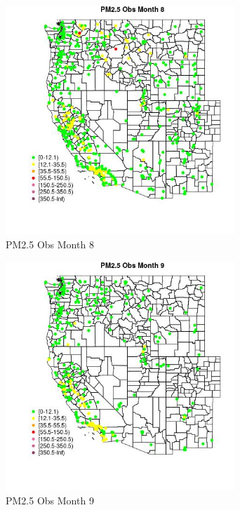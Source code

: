 \begin{figure} 
\centering  
\includegraphics[width=0.77\textwidth]{Code_Outputs/Report_ML_input_PM25_Step4_part_e_de_duplicated_aves_compiled_2019-05-18wNAs_MapObsMo8PM25_Obs.jpg} 
\caption{\label{fig:Report_ML_input_PM25_Step4_part_e_de_duplicated_aves_compiled_2019-05-18wNAsMapObsMo8PM25_Obs}PM2.5 Obs Month 8} 
\end{figure} 
 

\begin{figure} 
\centering  
\includegraphics[width=0.77\textwidth]{Code_Outputs/Report_ML_input_PM25_Step4_part_e_de_duplicated_aves_compiled_2019-05-18wNAs_MapObsMo9PM25_Obs.jpg} 
\caption{\label{fig:Report_ML_input_PM25_Step4_part_e_de_duplicated_aves_compiled_2019-05-18wNAsMapObsMo9PM25_Obs}PM2.5 Obs Month 9} 
\end{figure} 
 

